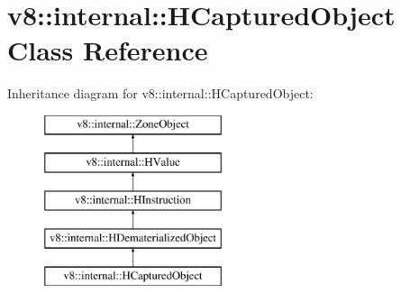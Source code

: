 \hypertarget{classv8_1_1internal_1_1_h_captured_object}{}\section{v8\+:\+:internal\+:\+:H\+Captured\+Object Class Reference}
\label{classv8_1_1internal_1_1_h_captured_object}
Inheritance diagram for v8\+:\+:internal\+:\+:H\+Captured\+Object\+:\begin{figure}[H]
\begin{center}
\leavevmode
\includegraphics[height=5.000000cm]{classv8_1_1internal_1_1_h_captured_object}
\end{center}
\end{figure}
